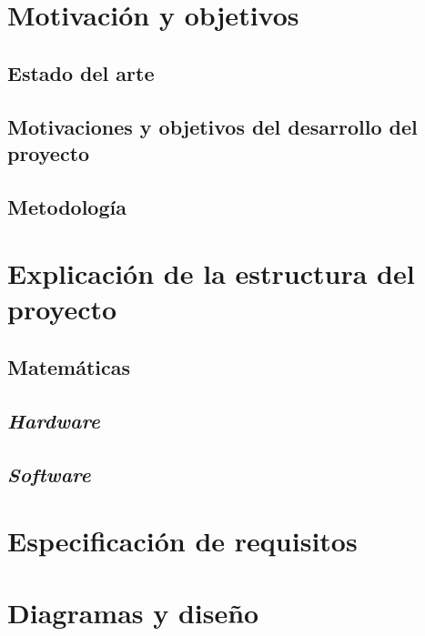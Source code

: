 \chapter{Motivación y objetivos}
\section{Estado del arte}

\section{Motivaciones y objetivos del desarrollo del proyecto}

\section{Metodología}
\label{sec:methodology}


\chapter{Explicación de la estructura del proyecto} 

\section{Matemáticas}

\section{\textit{Hardware}}

\section{\textit{Software}}


\chapter{Especificación de requisitos}

\chapter{Diagramas y diseño}



